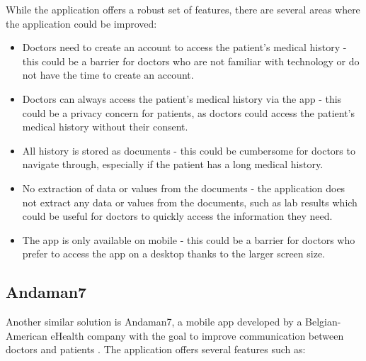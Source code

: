 While the application offers a robust set of features, there are several areas where the application could be improved:
\begin{itemize}
    \item Doctors need to create an account to access the patient's medical history - this could be a barrier for doctors who are not familiar with technology or do not have the time to create an account.
    \item Doctors can always access the patient's medical history via the app - this could be a privacy concern for patients, as doctors could access the patient's medical history without their consent.
    \item All history is stored as documents - this could be cumbersome for doctors to navigate through, especially if the patient has a long medical history.
    \item No extraction of data or values from the documents - the application does not extract any data or values from the documents, such as lab results which could be useful for doctors to quickly access the information they need.
    \item The app is only available on mobile - this could be a barrier for doctors who prefer to access the app on a desktop thanks to the larger screen size.
\end{itemize}

\subsection{Andaman7}

Another similar solution is Andaman7, a mobile app developed by a Belgian-American eHealth company with the goal to improve communication between doctors and patients \parencite{andaman}. The application offers several features such as:


